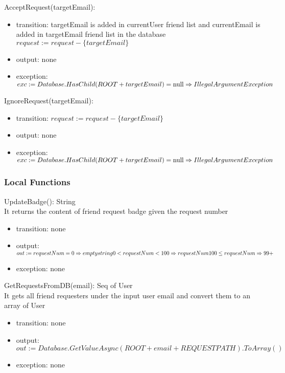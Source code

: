 \documentclass[12pt, titlepage]{article}
\begin{document}
\noindent AcceptRequest(targetEmail):
\begin{itemize}
\item transition: targetEmail is added in currentUser friend list and currentEmail is added in targetEmail friend list in the database\\$request := request - \{targetEmail\}$
\item output: none
\item exception: $exc := Database.HasChild(ROOT + targetEmail) = \text{null} \Rightarrow\\ IllegalArgument Exception$
\end{itemize}

\noindent IgnoreRequest(targetEmail):
\begin{itemize}
\item transition: $request := request - \{targetEmail\}$
\item output: none
\item exception: $exc := Database.HasChild(ROOT + targetEmail) = \text{null} \Rightarrow\\ IllegalArgument Exception$
\end{itemize}

\subsubsection{Local Functions}

\noindent UpdateBadge(): String\\
It returns the content of friend request badge given the request number
\begin{itemize}
\item transition: none
\item output: $out := requestNum = 0 \Rightarrow empty string \\ 0 < requestNum < 100 \Rightarrow requestNum\\ 100 \leq requestNum \Rightarrow 99+$
\item exception: none
\end{itemize}

\noindent GetRequestsFromDB(email): Seq of User\\
It gets all friend requesters under the input user email and convert them to an array of User
\begin{itemize}
\item transition: none
\item output: $out := Database.GetValueAsync(ROOT + email + REQUESTPATH).ToArray()$
\item exception: none
\end{itemize}
\end{document}

